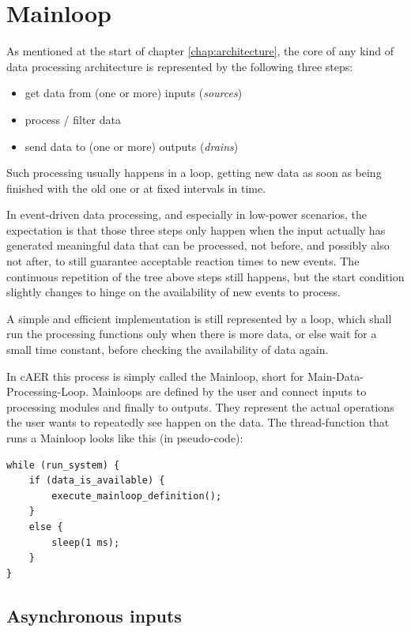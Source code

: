 \documentclass[a4paper,12pt]{report}
\begin{document}
\section{Mainloop} \label{sec:mainloop}

As mentioned at the start of chapter \ref{chap:architecture}, the core of any kind of data processing architecture is represented by the following three steps:
\begin{itemize}
\item get data from (one or more) inputs (\emph{sources})
\item process / filter data
\item send data to (one or more) outputs (\emph{drains})
\end{itemize}
Such processing usually happens in a loop, getting new data as soon as being finished with the old one or at fixed intervals in time.

In event-driven data processing, and especially in low-power scenarios, the expectation is that those three steps only happen when the input actually has generated meaningful data that can be processed, not before, and possibly also not after, to still guarantee acceptable reaction times to new events.
The continuous repetition of the tree above steps still happens, but the start condition slightly changes to hinge on the availability of new events to process.

A simple and efficient implementation is still represented by a loop, which shall run the processing functions only when there is more data, or else wait for a small time constant, before checking the availability of data again.

In cAER this process is simply called the Mainloop, short for Main-Data-Processing-Loop.
Mainloops are defined by the user and connect inputs to processing modules and finally to outputs.
They represent the actual operations the user wants to repeatedly see happen on the data.
\clearpage
The thread-function that runs a Mainloop looks like this (in pseudo-code):

\begin{lstlisting}
while (run_system) {
    if (data_is_available) {
        execute_mainloop_definition();
    }
    else {
        sleep(1 ms);
    }
}
\end{lstlisting}

\subsection{Asynchronous inputs} \label{sec:asynchronous_inputs}
\end{document}
